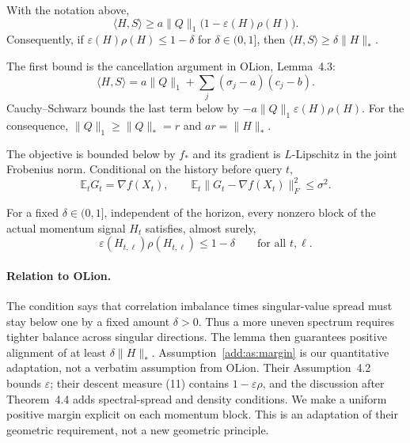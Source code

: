 \begin{lemma}
\label{add:lem:alignment}
With the notation above,
\begin{equation}\label{add:eq:alignment}
 \langle H,S\rangle\ge
 a\|Q\|_1\bigl(1-\varepsilon(H)\rho(H)\bigr).
\end{equation}
Consequently, if $\varepsilon(H)\rho(H)\le1-\delta$ for
$\delta\in(0,1]$, then $\langle H,S\rangle\ge\delta\|H\|_*$.
\end{lemma}
\begin{paperproof}
The first bound is the cancellation argument in OLion, Lemma~4.3:
\[
 \langle H,S\rangle
 =a\|Q\|_1+\sum_j(\sigma_j-a)(c_j-b).
\]
Cauchy--Schwarz bounds the last term below by
$-a\|Q\|_1\varepsilon(H)\rho(H)$.
For the consequence, $\|Q\|_1\ge\|Q\|_*=r$ and
$ar=\|H\|_*$.
\end{paperproof}

\begin{assumption}
\label{add:as:regularity}
The objective is bounded below by $f_*$ and its gradient is $L$-Lipschitz
in the joint Frobenius norm. Conditional on the history before query $t$,
\[
 \mathbb E_tG_t=\nabla f(X_t),\qquad
 \mathbb E_t\|G_t-\nabla f(X_t)\|_F^2\le\sigma^2.
\]
\end{assumption}

\begin{assumption}
\label{add:as:margin}
For a fixed $\delta\in(0,1]$, independent of the horizon, every nonzero block of the actual momentum
signal $H_t$ satisfies, almost surely,
\[
 \varepsilon(H_{t,\ell})\rho(H_{t,\ell})\le1-\delta
 \qquad\text{for all }t,\ell.
\]
\end{assumption}

\paragraph{Relation to OLion.}
The condition says that correlation imbalance times singular-value spread
must stay below one by a fixed amount $\delta>0$. Thus a more uneven
spectrum requires tighter balance across singular directions. The lemma
then guarantees positive alignment of at least $\delta\|H\|_*$.
Assumption~\ref{add:as:margin} is our quantitative adaptation, not a verbatim
assumption from OLion. Their Assumption~4.2 bounds $\varepsilon$; their
descent measure (11) contains $1-\varepsilon\rho$, and the discussion after
Theorem~4.4 adds spectral-spread and density conditions. We make a uniform
positive margin explicit on each momentum block. This is an adaptation of
their geometric requirement, not a new geometric principle.

